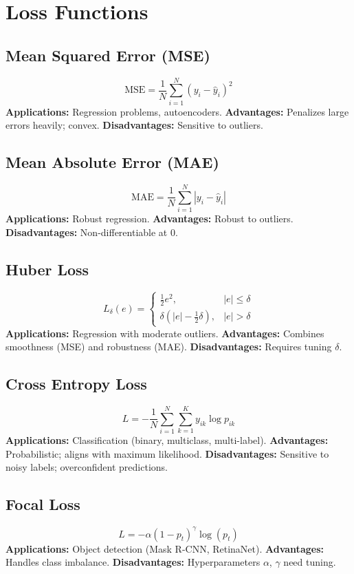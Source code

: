 \documentclass[11pt]{article}
\begin{document}

\section{Loss Functions}

\subsection{Mean Squared Error (MSE)}
\[
\mathrm{MSE} = \frac{1}{N}\sum_{i=1}^{N}(y_i - \hat{y}_i)^2
\]
\textbf{Applications:} Regression problems, autoencoders.  
\textbf{Advantages:} Penalizes large errors heavily; convex.  
\textbf{Disadvantages:} Sensitive to outliers.

\subsection{Mean Absolute Error (MAE)}
\[
\mathrm{MAE} = \frac{1}{N}\sum_{i=1}^{N} |y_i - \hat{y}_i|
\]
\textbf{Applications:} Robust regression.  
\textbf{Advantages:} Robust to outliers.  
\textbf{Disadvantages:} Non-differentiable at 0.

\subsection{Huber Loss}
\[
L_\delta(e) =
\begin{cases}
\frac{1}{2}e^2, & |e| \le \delta \\
\delta(|e| - \frac{1}{2}\delta), & |e| > \delta
\end{cases}
\]
\textbf{Applications:} Regression with moderate outliers.  
\textbf{Advantages:} Combines smoothness (MSE) and robustness (MAE).  
\textbf{Disadvantages:} Requires tuning $\delta$.

\subsection{Cross Entropy Loss}
\[
L = -\frac{1}{N}\sum_{i=1}^N \sum_{k=1}^K y_{ik}\log p_{ik}
\]
\textbf{Applications:} Classification (binary, multiclass, multi-label).  
\textbf{Advantages:} Probabilistic; aligns with maximum likelihood.  
\textbf{Disadvantages:} Sensitive to noisy labels; overconfident predictions.

\subsection{Focal Loss}
\[
L = -\alpha (1 - p_t)^\gamma \log(p_t)
\]
\textbf{Applications:} Object detection (Mask R-CNN, RetinaNet).  
\textbf{Advantages:} Handles class imbalance.  
\textbf{Disadvantages:} Hyperparameters $\alpha$, $\gamma$ need tuning.
\end{document}

